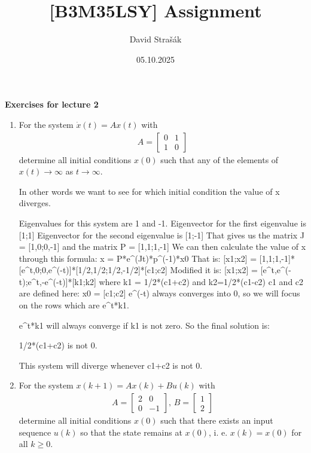 \documentclass[10pt]{article} %
\title{[B3M35LSY] Assignment}
\author{David Strašák}
\date{05.10.2025} %
\begin{document}

{\bf Exercises for lecture 2}

\begin{enumerate}
\item For the system $\dot{x}(t) = Ax(t)$ with
\begin{eqnarray*}
A=\begin{bmatrix}
0 & 1\\
1 & 0 
\end{bmatrix}
\end{eqnarray*}
determine all initial conditions $x(0)$ such that any of the elements of $x(t) \rightarrow \infty$ as $t \rightarrow \infty$.

In other words we want to see for which initial condition the value of x diverges.

Eigenvalues for this system are 1 and -1.
Eigenvector for the first eigenvalue is [1;1]
Eigenvector for the second eigenvalue is [1;-1]
That gives us the matrix J = [1,0;0,-1] and the matrix P = [1,1;1,-1]
We can then calculate the value of x through this formula:
x = P*e^(Jt)*p^(-1)*x0
That is:
[x1;x2] = [1,1;1,-1]*[e^t,0;0,e^(-t)]*[1/2,1/2;1/2,-1/2]*[c1;c2]
Modified it is:
[x1;x2] = [e^t,e^(-t);e^t,-e^(-t)]*[k1;k2]
where k1 = 1/2*(c1+c2) and k2=1/2*(c1-c2)
c1 and c2 are defined here: x0 = [c1;c2]
e^(-t) always converges into 0, so we will focus on the rows which are e^t*k1.

e^t*k1 will always converge if k1 is not zero. So the final solution is:

1/2*(c1+c2) is not 0.

This system will diverge whenever c1+c2 is not 0.

\item For the system $x(k+1) = Ax(k) + Bu(k)$ with 
\begin{eqnarray*}
A=\begin{bmatrix}
2 & 0\\
0 & -1
\end{bmatrix},\,
B=\begin{bmatrix}
1\\
2
\end{bmatrix}
\end{eqnarray*}
determine all initial conditions $x(0)$ such that there exists an input sequence $u(k)$ so that the state remains  at $x(0)$, i. e. $x(k) = x(0)$ for all $k \geq 0$.


\end{enumerate}
\end{document}

